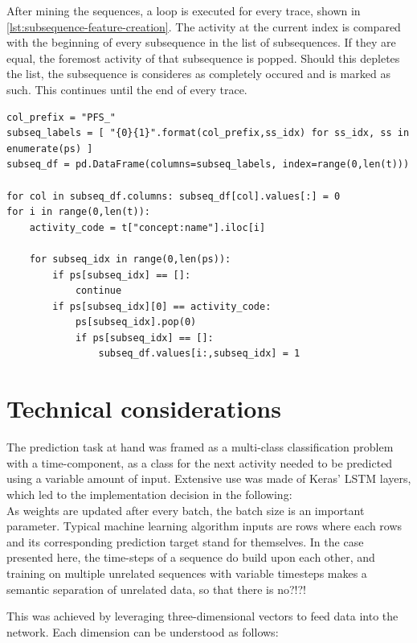 After mining the sequences, a loop is executed for every trace, shown in \autoref{lst:subsequence-feature-creation}. The activity at the current index is compared with the beginning of every subsequence in the list of subsequences. If they are equal, the foremost activity of that subsequence is popped. Should this depletes the list, the subsequence is consideres as completely occured and is marked as such. This continues until the end of every trace.

\begin{lstlisting}[caption={Creating the subsequence features.}, label={lst:subsequence-feature-creation}]
col_prefix = "PFS_"
subseq_labels = [ "{0}{1}".format(col_prefix,ss_idx) for ss_idx, ss in enumerate(ps) ]
subseq_df = pd.DataFrame(columns=subseq_labels, index=range(0,len(t)))

for col in subseq_df.columns: subseq_df[col].values[:] = 0
for i in range(0,len(t)):
    activity_code = t["concept:name"].iloc[i]
    
    for subseq_idx in range(0,len(ps)):
        if ps[subseq_idx] == []:
            continue
        if ps[subseq_idx][0] == activity_code:
            ps[subseq_idx].pop(0)
            if ps[subseq_idx] == []:
                subseq_df.values[i:,subseq_idx] = 1
\end{lstlisting}


\section{Technical considerations}
The prediction task at hand was framed as a multi-class classification problem with a time-component, as a class for the next activity needed to be predicted using a variable amount of input. Extensive use was made of Keras' LSTM layers, which led to the implementation decision in the following:\\

As weights are updated after every batch, the batch size is an important parameter. Typical machine learning algorithm inputs are rows where each rows and its corresponding prediction target stand for themselves. In the case presented here, the time-steps of a sequence do build upon each other, and training on multiple unrelated sequences with variable timesteps makes a semantic separation of unrelated data, so that there is no?!?!

This was achieved by leveraging three-dimensional vectors to feed data into the network. Each dimension can be understood as follows:

